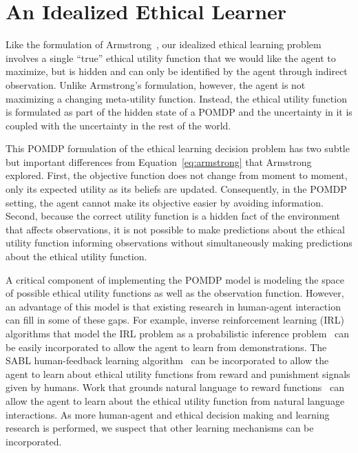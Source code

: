 \documentclass[11pt]{article}
\begin{document}
\section{An Idealized Ethical Learner}
Like the formulation of Armstrong~, our idealized ethical learning problem involves a single ``true'' ethical utility function that we would like the agent to maximize, but is hidden and can only be identified by the agent through indirect observation. Unlike Armstrong's formulation, however, the agent is not maximizing a changing meta-utility function. Instead, the ethical utility function is formulated as part of the hidden state of a POMDP and the uncertainty in it is coupled with the uncertainty in the rest of the world.

This POMDP formulation of the ethical learning decision problem has two subtle but important differences from Equation~\ref{eq:armstrong} that Armstrong explored. First, the objective function does not change from moment to moment, only its expected utility as its beliefs are updated. Consequently, in the POMDP setting, the agent cannot make its objective easier by avoiding information. Second, because the correct utility function is a hidden fact of the environment that affects observations, it is not possible to make predictions about the ethical utility function informing observations without simultaneously making predictions about the ethical utility function.

A critical component of implementing the POMDP model is modeling the space of possible ethical utility functions as well as the observation function. However, an advantage of this model is that existing research in human-agent interaction can fill in some of these gaps. For example, inverse reinforcement learning (IRL) algorithms that model the IRL problem as a probabilistic inference problem~\cite{ramachandran2007bayesian,ziebart2008maximum,babes2011apprenticeship,macglashan2015between} can be easily incorporated to allow the agent to learn from demonstrations. The SABL human-feedback learning algorithm~\cite{loftin2014strategy} can be incorporated to allow the agent to learn about ethical utility functions from reward and punishment signals given by humans. Work that grounds natural language to reward functions~\cite{macglashanGrounding2015} can allow the agent to learn about the ethical utility function from natural language interactions. As more human-agent and ethical decision making and learning research is performed, we suspect that other learning mechanisms can be incorporated.
\end{document}
